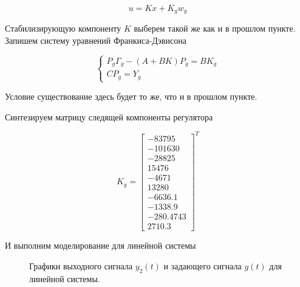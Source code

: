 \begin{equation}
	u = Kx + K_g w_g
\end{equation}

Стабилизирующую компоненту $K$ выберем такой же как и в прошлом пункте. 
Запишем систему уравнений Франкиса-Дэвисона

\begin{equation}
	\begin{cases}
		P_g \Gamma_g - (A+BK) P_g = BK_g\\
		CP_g = Y_g
	\end{cases}
\end{equation}

Условие существование здесь будет то же, что и в прошлом пункте.

Синтезируем матрицу следящей компоненты регулятора

\begin{equation}
	K_g = \begin{bmatrix}
		-83795\\	-101630\\	-28825\\	15476\\	-4671\\	13280\\	-6636.1\\	-1338.9\\	-280.4743\\	2710.3
	\end{bmatrix}^T
\end{equation}

И выполним моделирование для линейной системы

\begin{figure}[!h]
	\caption{Графики выходного сигнала $y_2(t)$ и задающего сигнала $g(t)$ для линейной системы.}
	\label{5_g_lin}
\end{figure}

